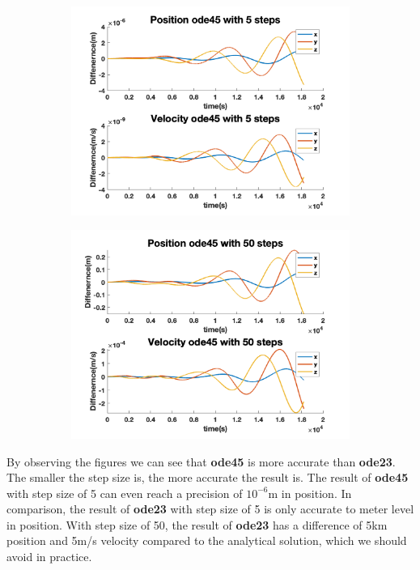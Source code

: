 \documentclass[12pt
,headinclude
,headsepline
,bibtotocnumbered
]{scrartcl}
\begin{document}
\begin{figure}[H]
\begin{subfigure}[b]{0.45\textwidth}
\includegraphics[width=1\textwidth]{./plots/ode45_5_yprime.png}
\end{subfigure}
\begin{subfigure}[b]{0.45\textwidth}
\includegraphics[width=1\textwidth]{./plots/ode45_50_yprime.png}
\end{subfigure}
\end{figure}
By observing the figures we can see that \textbf{ode45} is more accurate than \textbf{ode23}. The smaller the step size is, the more accurate the result is. The result of \textbf{ode45} with step size of 5 can even reach a precision of $10^{-6}$m in position. In comparison, the result of \textbf{ode23} with step size of 5 is only accurate to meter level in position. With step size of 50, the result of \textbf{ode23} has a difference of 5km position and 5m/s velocity compared to the analytical solution, which we should avoid in practice.
\end{document}
